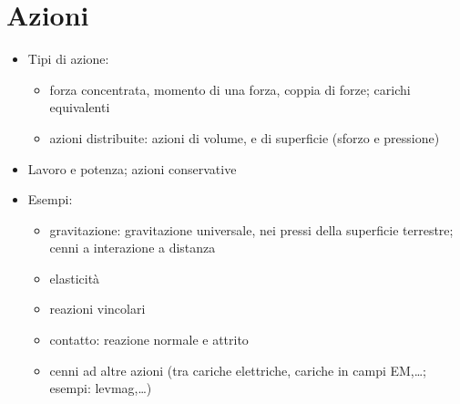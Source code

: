 \documentclass[letterpaper,10pt,italian]{jupyterBook}
\begin{document}
\chapter{Azioni}
\label{\detokenize{ch/mechanics/actions:azioni}}\label{\detokenize{ch/mechanics/actions:physics-hs-mechanics-actions}}\label{\detokenize{ch/mechanics/actions::doc}}\begin{itemize}
\item {} 
\sphinxAtStartPar
Tipi di azione:
\begin{itemize}
\item {} 
\sphinxAtStartPar
forza concentrata, momento di una forza, coppia di forze; carichi equivalenti

\item {} 
\sphinxAtStartPar
azioni distribuite: azioni di volume, e di superficie (sforzo e pressione)

\end{itemize}

\item {} 
\sphinxAtStartPar
Lavoro e potenza; azioni conservative

\item {} 
\sphinxAtStartPar
Esempi:
\begin{itemize}
\item {} 
\sphinxAtStartPar
gravitazione: gravitazione universale, nei pressi della superficie terrestre; cenni a interazione a distanza

\item {} 
\sphinxAtStartPar
elasticità

\item {} 
\sphinxAtStartPar
reazioni vincolari

\item {} 
\sphinxAtStartPar
contatto: reazione normale e attrito

\item {} 
\sphinxAtStartPar
cenni ad altre azioni (tra cariche elettriche, cariche in campi EM,…; esempi: levmag,…)

\end{itemize}

\end{itemize}





\sphinxstepscope
\end{document}
